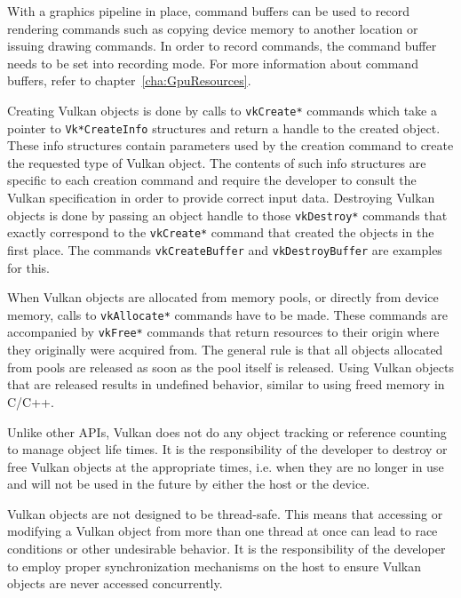     With a graphics pipeline in place, command buffers can be used to record rendering commands such as copying device memory to another location or issuing drawing commands. In order to record commands, the command buffer needs to be set into recording mode. For more information about command buffers, refer to chapter~\ref{cha:GpuResources}.


    Creating Vulkan objects is done by calls to \lstinline{vkCreate*} commands which take a pointer to \lstinline{Vk*CreateInfo}{} structures and return a handle to the created object. These info structures contain parameters used by the creation command to create the requested type of Vulkan object. The contents of such info structures are specific to each creation command and require the developer to consult the Vulkan specification in order to provide correct input data. Destroying Vulkan objects is done by passing an object handle to those \lstinline{vkDestroy*} commands that exactly correspond to the \lstinline{vkCreate*} command that created the objects in the first place. The commands \lstinline{vkCreateBuffer} and \lstinline{vkDestroyBuffer} are examples for this.

    When Vulkan objects are allocated from memory pools, or directly from device memory, calls to \lstinline{vkAllocate*} commands have to be made. These commands are accompanied by \lstinline{vkFree*} commands that return resources to their origin where they originally were acquired from. The general rule is that all objects allocated from pools are released as soon as the pool itself is released. Using Vulkan objects that are released results in undefined behavior, similar to using freed memory in C/C++.

    Unlike other APIs, Vulkan does not do any object tracking or reference counting to manage object life times. It is the responsibility of the developer to destroy or free Vulkan objects at the appropriate times, i.e. when they are no longer in use and will not be used in the future by either the host or the device.

    Vulkan objects are not designed to be thread-safe. This means that accessing or modifying a Vulkan object from more than one thread at once can lead to race conditions or other undesirable behavior. It is the responsibility of the developer to employ proper synchronization mechanisms on the host to ensure Vulkan objects are never accessed concurrently.

